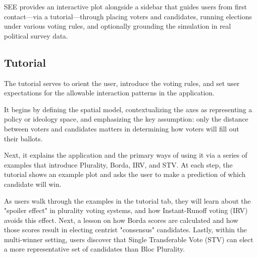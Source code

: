 SEE provides an interactive plot alongside a sidebar that guides users from first contact---via
a tutorial---through placing voters and candidates, running elections under various voting rules,
and optionally grounding the simulation in real political survey data.

\subsection{Tutorial}%
\label{sub:Tutorial}
The tutorial serves to orient the user, introduce the voting rules,
and set user expectations for the allowable interaction patterns in the application.

It begins by defining the spatial model, contextualizing the axes
as representing a policy or ideology space, and emphasizing the
key assumption: only the distance between voters and candidates matters
in determining how voters will fill out their ballots.

Next, it explains the application and the primary ways of using it
via a series of examples that introduce Plurality, Borda, IRV, and STV.
At each step, the tutorial shows an example plot
and asks the user to make a prediction of which candidate will win.

As users walk through the examples in the tutorial tab, they will learn about the "spoiler effect" in 
plurality voting systems, and how Instant-Runoff voting (IRV) avoids this effect. 
Next, a lesson on how Borda scores are calculated and how those scores result in electing 
centrist "consensus" candidates. Lastly, within the multi-winner setting, users discover that
 Single Transferable Vote (STV) can elect a more representative set of candidates than Bloc Plurality.

